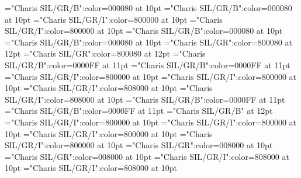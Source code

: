 \documentclass[a4paper,twoside]{article}
\begin{document}
\font\spanmxbheadwordvariantformentrybackrefbvariantformentrybackrefsbentry="Charis SIL/GR/B":color=000080 at 10pt
\font\spanheadwordvariantformentrybackrefbvariantformentrybackrefsbentry="Charis SIL/GR/B":color=000080 at 10pt
\font\spanesownertypeabbreviationminimallexreferenceminimallexreferencesentry="Charis SIL/GR/I":color=800000 at 10pt
\font\spanownertypeabbreviationminimallexreferenceminimallexreferencesentry="Charis SIL/GR/I":color=800000 at 10pt
\font\spanmxbheadwordconfigtargetconfigtargetsminimallexreferenceminimallexreferencesentry="Charis SIL/GR/B":color=000080 at 10pt
\font\spanheadwordconfigtargetconfigtargetsminimallexreferenceminimallexreferencesentry="Charis SIL/GR/B":color=000080 at 10pt
\font\spanesliteralmeaningentry="Charis SIL/GR":color=800080 at 12pt
\font\spanliteralmeaningentry="Charis SIL/GR":color=800080 at 12pt
\font\spanmxbheadwordvisiblecomplexformbackrefvisiblecomplexformbackrefsentry="Charis SIL/GR/B":color=0000FF at 11pt
\font\spanheadwordvisiblecomplexformbackrefvisiblecomplexformbackrefsentry="Charis SIL/GR/B":color=0000FF at 11pt
\font\spanespartofspeechmorphosyntaxanalysesvisiblecomplexformbackrefsentry="Charis SIL/GR/I":color=800000 at 10pt
\font\spanpartofspeechmorphosyntaxanalysesvisiblecomplexformbackrefsentry="Charis SIL/GR/I":color=800000 at 10pt
\font\spanessummaryvisiblecomplexformbackrefsentry="Charis SIL/GR/I":color=808000 at 10pt
\font\spansummaryvisiblecomplexformbackrefsentry="Charis SIL/GR/I":color=808000 at 10pt
\font\spanmxbheadwordmainentrycomplex="Charis SIL/GR/B":color=0000FF at 11pt
\font\spanheadwordmainentrycomplex="Charis SIL/GR/B":color=0000FF at 11pt
\font\sensenumbersensecontentsensesmainentrycomplex="Charis SIL/GR/B" at 12pt
\font\spanespartofspeechmorphosyntaxanalysissharedgrammaticalinfosensesmainentrycomplex="Charis SIL/GR/I":color=800000 at 10pt
\font\spanpartofspeechmorphosyntaxanalysissharedgrammaticalinfosensesmainentrycomplex="Charis SIL/GR/I":color=800000 at 10pt
\font\spanespartofspeechmorphosyntaxanalysissensesensecontentsensesmainentrycomplex="Charis SIL/GR/I":color=800000 at 10pt
\font\spanpartofspeechmorphosyntaxanalysissensesensecontentsensesmainentrycomplex="Charis SIL/GR/I":color=800000 at 10pt
\font\spanesdefinitionsensesensecontentsensesmainentrycomplex="Charis SIL/GR":color=008000 at 10pt
\font\spandefinitionsensesensecontentsensesmainentrycomplex="Charis SIL/GR":color=008000 at 10pt
\font\comentariorestrictivosensesensecontentsensesmainentrycomplex="Charis SIL/GR/I":color=808000 at 10pt
\font{}="Charis SIL/GR/I":color=808000 at 10pt
\end{document}
